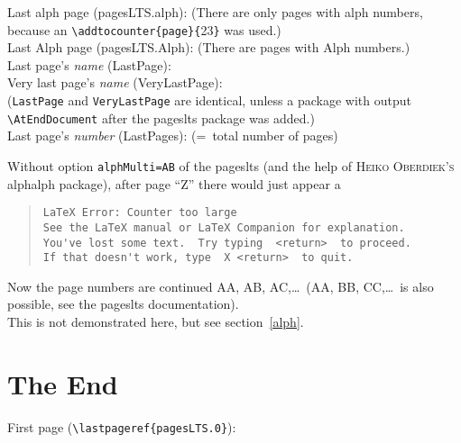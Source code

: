 \documentclass[british]{article}
\def\pagesLTSexamplealph{23}
\begin{document}
\noindent Last alph page (pagesLTS.alph): 
(There are only  pages with alph numbers,
because an \verb|\addtocounter{page}{|\pagesLTSexamplealph\verb|}| was used.)\\

\noindent Last Alph page (pagesLTS.Alph): 
(There are  pages with Alph numbers.)\\

\noindent Last page's \textit{name} (LastPage): \\

\noindent Very last page's \textit{name} (VeryLastPage): \\
(\texttt{LastPage} and \texttt{VeryLastPage} are identical, unless
a package with output \linebreak
\verb|\AtEndDocument| after the \textsf{pageslts} package was added.)\\

\noindent Last page's \textit{number} (LastPages): 
(=~total number of pages)\\

\lipsum[1-3]

Without option \texttt{alphMulti=AB} of the \textsf{pageslts} (and the help of
\textsc{Heiko Oberdiek's} \textsf{alphalph} package), after page
\textquotedblleft Z\textquotedblright{} there would just appear a
\begin{quote}
\begin{verbatim}
LaTeX Error: Counter too large
See the LaTeX manual or LaTeX Companion for explanation.
You've lost some text.  Try typing  <return>  to proceed.
If that doesn't work, type  X <return>  to quit.
\end{verbatim}
\end{quote}
Now the page numbers are continued AA, AB, AC,\ldots\ (AA, BB, CC,\ldots\ is
also possible, see the \textsf{pageslts} documentation).\\
This is not demonstrated here, but see section~\ref{alph}.

\newpage

\section{The End}

\noindent First page (\verb|\lastpageref{pagesLTS.0}|):
 \\
\end{document}
